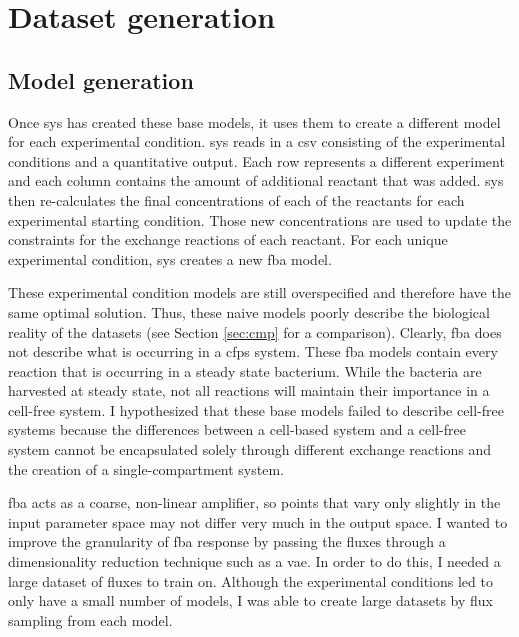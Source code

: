 \section{Dataset generation}

\subsection{Model generation}
Once \gls{sys} has created these base models, it uses them to create a different model for each experimental condition.
\gls{sys} reads in a \gls{csv} consisting of the experimental conditions and a quantitative output.
Each row represents a different experiment and each column contains the amount of additional reactant that was added.
\gls{sys} then re-calculates the final concentrations of each of the reactants for each experimental starting condition.
Those new concentrations are used to update the constraints for the exchange reactions of each reactant.
For each unique experimental condition, \gls{sys} creates a new \gls{fba} model.

These experimental condition models are still overspecified and therefore have the same optimal solution.
Thus, these naive models poorly describe the biological reality of the datasets (see Section \ref{sec:cmp} for a comparison).
Clearly, \gls{fba} does not describe what is occurring in a \gls{cfps} system.
These \gls{fba} models contain every reaction that is occurring in a steady state bacterium.
While the bacteria are harvested at steady state, not all reactions will maintain their importance in a cell-free system.
I hypothesized that these base models failed to describe cell-free systems because the differences between a cell-based system and a cell-free system cannot be encapsulated solely through different exchange reactions and the creation of a single-compartment system.

\gls{fba} acts as a coarse, non-linear amplifier, so points that vary only slightly in the input parameter space may not differ very much in the output space.
I wanted to improve the granularity of \gls{fba} response by passing the fluxes through a dimensionality reduction technique such as a \gls{vae}.
In order to do this, I needed a large dataset of fluxes to train on.
Although the experimental conditions led to only have a small number of models, I was able to create large datasets by flux sampling from each model.

